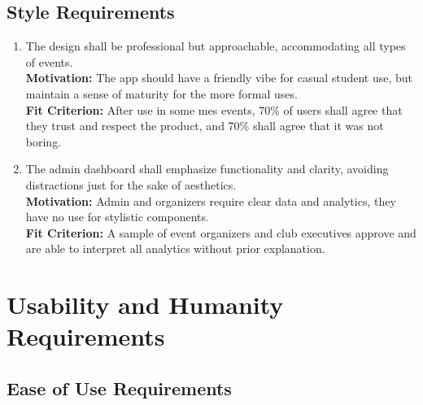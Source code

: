 \documentclass[12pt]{article}
\begin{document}
\subsection{Style Requirements}
\begin{enumerate}[label=LFR-S.\arabic*, wide=0pt, leftmargin=*]
  \item The design shall be professional but approachable, accommodating all types of events.\\[2mm]
    {\bf Motivation:} The app should have a friendly vibe for casual student use, but maintain a sense of maturity for the more formal uses.\\
    {\bf Fit Criterion:} After use in some \gls{mes} events, 70\% of users shall agree that they trust and respect the product, and 70\% shall agree that it was not boring.
  \item The admin dashboard shall emphasize functionality and clarity, avoiding distractions just for the sake of aesthetics.\\[2mm]
    {\bf Motivation:} Admin and organizers require clear data and analytics, they have no use for stylistic components.\\
    {\bf Fit Criterion:} A sample of event organizers and club executives approve and are able to interpret all analytics without prior explanation.
\end{enumerate}

\section{Usability and Humanity Requirements}
\subsection{Ease of Use Requirements}
\end{document}
